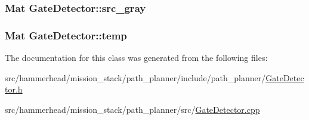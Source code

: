 \subsubsection[{\texorpdfstring{src\+\_\+gray}{src_gray}}]{\setlength{\rightskip}{0pt plus 5cm}Mat Gate\+Detector\+::src\+\_\+gray}\hypertarget{classGateDetector_ad66d72fc2bd9f66ef5fbf9e012d2deea}{}\label{classGateDetector_ad66d72fc2bd9f66ef5fbf9e012d2deea}
\subsubsection[{\texorpdfstring{temp}{temp}}]{\setlength{\rightskip}{0pt plus 5cm}Mat Gate\+Detector\+::temp}\hypertarget{classGateDetector_a15e463a88c0732623798929ba696f693}{}\label{classGateDetector_a15e463a88c0732623798929ba696f693}


The documentation for this class was generated from the following files\+:\begin{DoxyCompactItemize}
\item 
src/hammerhead/mission\+\_\+stack/path\+\_\+planner/include/path\+\_\+planner/\hyperlink{GateDetector_8h}{Gate\+Detector.\+h}\item 
src/hammerhead/mission\+\_\+stack/path\+\_\+planner/src/\hyperlink{GateDetector_8cpp}{Gate\+Detector.\+cpp}\end{DoxyCompactItemize}
